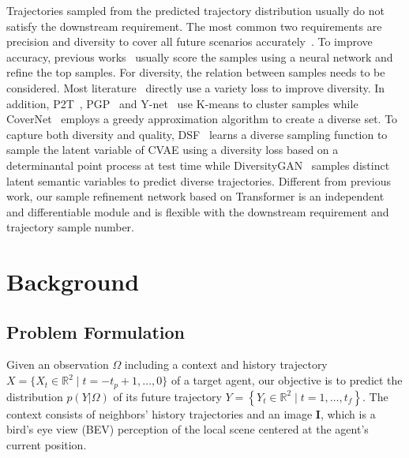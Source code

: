 \documentclass[10pt,twocolumn,letterpaper]{article}
\begin{document}
Trajectories sampled from the predicted trajectory distribution usually do not satisfy the downstream requirement. The most common two requirements are precision and diversity to cover all future scenarios accurately~\cite{rhinehart2018r2p2,park2020diverse}. To improve accuracy, previous works~\cite{lee2017desire,zhao2020tnt,marchetti2020mantra} usually score the samples using a neural network and refine the top samples. For diversity, the relation between samples needs to be considered. Most literature~\cite{gupta2018social,huang2019stgat,dendorfer2020goal} directly use a variety loss to improve diversity. In addition, P2T~\cite{deo2020trajectory}, PGP~\cite{deo2021multimodal} and Y-net~\cite{mangalam2021goals} use K-means to cluster samples while CoverNet~\cite{phan2020covernet} employs a greedy approximation algorithm to create a diverse set. To capture both diversity and quality, DSF~\cite{yuan2020diverse} learns a diverse sampling function to sample the latent variable of CVAE using a diversity loss based on a determinantal point process at test time while DiversityGAN~\cite{huang2020diversitygan} samples distinct latent semantic variables to predict diverse trajectories. Different from previous work, our sample refinement network based on Transformer is an independent and differentiable module and is flexible with the downstream requirement and trajectory sample number.

\section{Background}
\label{sec:background}
\subsection{Problem Formulation}

Given an observation $\Omega$ including a context and history trajectory $X=\{X_t\in \mathbb{R}^2 \mid t=-t_p+1,\dots,0\}$ of a target agent, our objective is to predict the distribution $p(Y|\Omega)$ of its future trajectory $Y=\left\{Y_t\in \mathbb{R}^2\mid t=1,\dots,t_f\right\}$. The context consists of neighbors' history trajectories and an image $\mathbf{I}$, which is a bird's eye view (BEV) perception of the local scene centered at the agent's current position.
\end{document}
